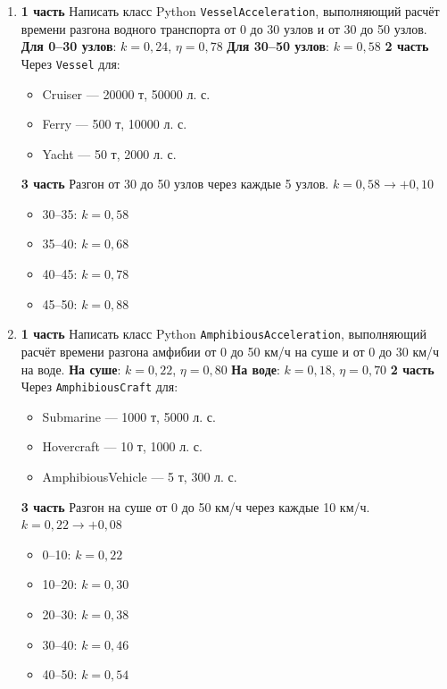 \begin{enumerate}
    \item[9] \textbf{1 часть}  
    Написать класс Python \texttt{VesselAcceleration}, выполняющий расчёт времени разгона водного транспорта от 0 до 30 узлов и от 30 до 50 узлов.  
    \textbf{Для 0–30 узлов}: $k = 0{,}24$, $\eta = 0{,}78$  
    \textbf{Для 30–50 узлов}: $k = 0{,}58$  
    \textbf{2 часть}  
    Через \texttt{Vessel} для:  
    \begin{itemize}
        \item Cruiser — 20000 т, 50000 л. с.  
        \item Ferry — 500 т, 10000 л. с.  
        \item Yacht — 50 т, 2000 л. с.  
    \end{itemize}
    \textbf{3 часть}  
    Разгон от 30 до 50 узлов через каждые 5 узлов. $k = 0{,}58 \to +0{,}10$  
    \begin{itemize}
        \item 30–35: $k = 0{,}58$  
        \item 35–40: $k = 0{,}68$  
        \item 40–45: $k = 0{,}78$  
        \item 45–50: $k = 0{,}88$  
    \end{itemize}

    \item[10] \textbf{1 часть}  
    Написать класс Python \texttt{AmphibiousAcceleration}, выполняющий расчёт времени разгона амфибии от 0 до 50 км/ч на суше и от 0 до 30 км/ч на воде.  
    \textbf{На суше}: $k = 0{,}22$, $\eta = 0{,}80$  
    \textbf{На воде}: $k = 0{,}18$, $\eta = 0{,}70$  
    \textbf{2 часть}  
    Через \texttt{AmphibiousCraft} для:  
    \begin{itemize}
        \item Submarine — 1000 т, 5000 л. с.  
        \item Hovercraft — 10 т, 1000 л. с.  
        \item AmphibiousVehicle — 5 т, 300 л. с.  
    \end{itemize}
    \textbf{3 часть}  
    Разгон на суше от 0 до 50 км/ч через каждые 10 км/ч. $k = 0{,}22 \to +0{,}08$  
    \begin{itemize}
        \item 0–10: $k = 0{,}22$  
        \item 10–20: $k = 0{,}30$  
        \item 20–30: $k = 0{,}38$  
        \item 30–40: $k = 0{,}46$  
        \item 40–50: $k = 0{,}54$  
    \end{itemize}


\end{enumerate}
